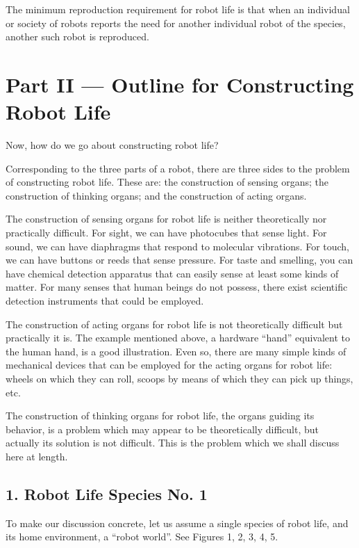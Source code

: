 \documentclass[11pt]{article}
\begin{document}
The minimum reproduction requirement for robot life is that when an individual
or society of robots reports the need for another individual robot of the
species, another such robot is reproduced.

\clearpage

\section*{Part II --- Outline for Constructing Robot Life}

Now, how do we go about constructing robot life?

Corresponding to the three parts of a robot, there are three sides to the
problem of constructing robot life. These are: the construction of sensing
organs; the construction of thinking organs; and the construction of acting
organs.

The construction of sensing organs for robot life is neither theoretically nor
practically difficult. For sight, we can have photocubes that sense light. For
sound, we can have diaphragms that respond to molecular vibrations. For touch,
we can have buttons or reeds that sense pressure. For taste and smelling, you
can have chemical detection apparatus that can easily sense at least some kinds
of matter. For many senses that human beings do not possess, there exist
scientific detection instruments that could be employed.

The construction of acting organs for robot life is not theoretically difficult
but practically it is. The example mentioned above, a hardware ``hand''
equivalent to the human hand, is a good illustration. Even so, there are many
simple kinds of mechanical devices that can be employed for the acting organs
for robot life: wheels on which they can roll, scoops by means of which they
can pick up things, etc.

The construction of thinking organs for robot life, the organs guiding its
behavior, is a problem which may appear to be theoretically difficult, but
actually its solution is not difficult. This is the problem which we shall
discuss here at length.

\subsection*{1. Robot Life Species No. 1}

To make our discussion concrete, let us assume a single species of robot life,
and its home environment, a ``robot world''. See Figures 1, 2, 3, 4, 5.
\end{document}
